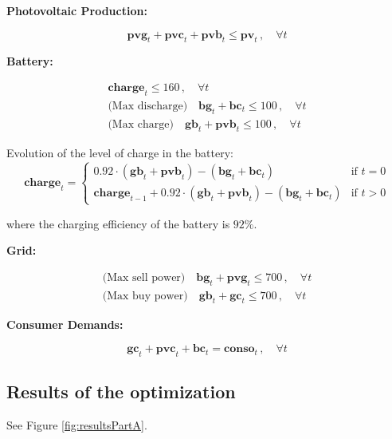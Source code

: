 \documentclass[12pt]{article}
\begin{document}
\textbf{Photovoltaic Production:}

\begin{equation}
\mathbf{pvg}_t + \mathbf{pvc}_t + \mathbf{pvb}_t \leq \mathbf{pv}_t \, , \quad \forall t
\end{equation}

\textbf{Battery:}

\begin{eqnarray}
\mathbf{charge}_t \leq 160 \, , \quad \forall t \\
\text{(Max discharge)} \quad \mathbf{bg}_t + \mathbf{bc}_t \leq 100 \, , \quad \forall t \\
\text{(Max charge)} \quad \mathbf{gb}_t + \mathbf{pvb}_t \leq 100 \, , \quad \forall t
\end{eqnarray}

Evolution of the level of charge in the battery:
\begin{equation}
\mathbf{charge}_t =
\begin{cases}
0.92 \cdot (\mathbf{gb}_t + \mathbf{pvb}_t) - (\mathbf{bg}_t + \mathbf{bc}_t) & \text{if } t = 0 \\
\mathbf{charge}_{t-1} + 0.92 \cdot (\mathbf{gb}_t + \mathbf{pvb}_t) - (\mathbf{bg}_t + \mathbf{bc}_t) & \text{if } t > 0
\end{cases}
\end{equation}

where the charging efficiency of the battery is $92 \%$.

\textbf{Grid:}

\begin{eqnarray}
\text{(Max sell power)} \quad \mathbf{bg}_t + \mathbf{pvg}_t \leq 700 \, , \quad \forall t \\
\text{(Max buy power)} \quad \mathbf{gb}_t + \mathbf{gc}_t \leq 700 \, , \quad \forall t
\end{eqnarray}

\textbf{Consumer Demands:}

\begin{equation}
\mathbf{gc}_t + \mathbf{pvc}_t + \mathbf{bc}_t = \mathbf{conso}_t \, , \quad \forall t
\end{equation}

\subsection{Results of the optimization}

See Figure \ref{fig:resultsPartA}.
\end{document}
